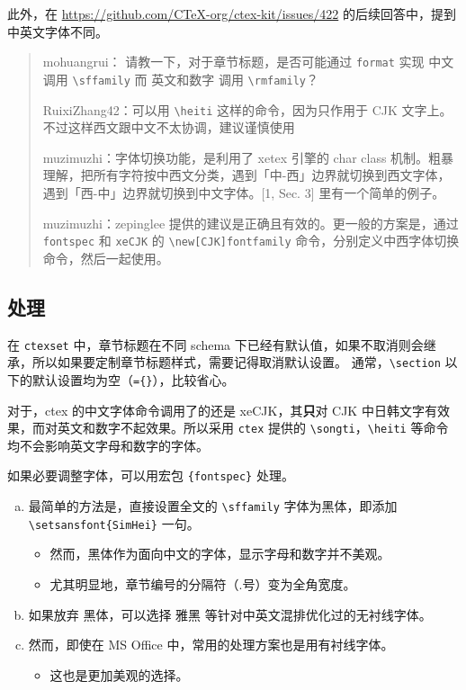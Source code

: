 \documentclass[../Main/thesis.tex]{subfiles}
\begin{document}
此外，在 \url{https://github.com/CTeX-org/ctex-kit/issues/422}
的后续回答中，提到中英文字体不同。

\begin{quote}
mohuangrui： 请教一下，对于章节标题，是否可能通过 \texttt{format} 实现 中文 调用 \texttt{\textbackslash{}sffamily} 而 英文和数字 调用 \texttt{\textbackslash{}rmfamily}？

RuixiZhang42：可以用 \texttt{\textbackslash{}heiti} 这样的命令，因为只作用于 CJK 文字上。不过这样西文跟中文不太协调，建议谨慎使用

muzimuzhi：字体切换功能，是利用了 xetex 引擎的 char class 机制。粗暴理解，把所有字符按中西文分类，遇到「中-西」边界就切换到西文字体，遇到「西-中」边界就切换到中文字体。[1, Sec. 3] 里有一个简单的例子。

muzimuzhi：zepinglee 提供的建议是正确且有效的。更一般的方案是，通过 \texttt{fontspec} 和 \texttt{xeCJK} 的
\texttt{\textbackslash{}new[CJK]fontfamily} 命令，分别定义中西字体切换命令，然后一起使用。
\end{quote}

\subsection{处理}

在 \texttt{ctexset} 中，章节标题在不同 schema 下已经有默认值，如果不取消则会继承，所以如果要定制章节标题样式，需要记得取消默认设置。
通常，\texttt{\textbackslash{}section} 以下的默认设置均为空（\texttt{=\{\}}），比较省心。

对于，ctex 的中文字体命令调用了的还是 xeCJK，其\textbf{只}对 CJK 中日韩文字有效果，而对英文和数字不起效果。所以采用 \texttt{ctex} 提供的 \texttt{\textbackslash{}songti}，\texttt{\textbackslash{}heiti} 等命令均不会影响英文字母和数字的字体。

如果必要调整字体，可以用宏包 \texttt{\{fontspec\}} 处理。

\begin{enumerate}[a.]
\item
  最简单的方法是，直接设置全文的 \texttt{\textbackslash{}sffamily}
  字体为黑体，即添加 \texttt{\textbackslash{}setsansfont\{SimHei\}}
  一句。

  \begin{itemize}
  \item
    然而，黑体作为面向中文的字体，显示字母和数字并不美观。
  \item
    尤其明显地，章节编号的分隔符（.号）变为全角宽度。
  \end{itemize}
\item
  如果放弃 黑体，可以选择 雅黑 等针对中英文混排优化过的无衬线字体。
\item
  然而，即使在 MS Office 中，常用的处理方案也是用有衬线字体。

  \begin{itemize}
  \item
    这也是更加美观的选择。
  \end{itemize}
\end{enumerate}
\end{document}
